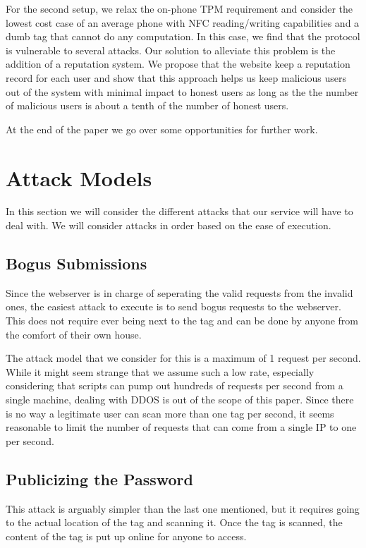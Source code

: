 \documentclass{sig-alternate}
\begin{document}
For the second setup, we relax the on-phone TPM requirement and
consider the lowest cost case of an average phone with NFC
reading/writing capabilities and a dumb tag that cannot do any
computation. In this case, we find that the protocol is vulnerable to
several attacks. Our solution to alleviate this problem is the
addition of a reputation system. We propose that the website keep a
reputation record for each user and show that this approach helps us
keep malicious users out of the system with minimal impact to honest
users as long as the the number of malicious users is about a tenth of
the number of honest users.

At the end of the paper we go over some opportunities for further
work.

\section{Attack Models}
In this section we will consider the different attacks that our
service will have to deal with. We will consider attacks in order
based on the ease of execution.

\subsection{Bogus Submissions}
Since the webserver is in charge of seperating the valid requests from
the invalid ones, the easiest attack to execute is to send bogus
requests to the webserver. This does not require ever being next to
the tag and can be done by anyone from the comfort of their own
house. 

The attack model that we consider for this is a maximum of 1 request
per second. While it might seem strange that we assume such a low
rate, especially considering that scripts can pump out hundreds of
requests per second from a single machine, dealing with DDOS is out of
the scope of this paper. Since there is no way a legitimate user can
scan more than one tag per second, it seems reasonable to limit the
number of requests that can come from a single IP to one per second.

\subsection{Publicizing the Password}
This attack is arguably simpler than the last one mentioned, but it
requires going to the actual location of the tag and scanning it. Once
the tag is scanned, the content of the tag is put up online for anyone
to access.
\end{document}

